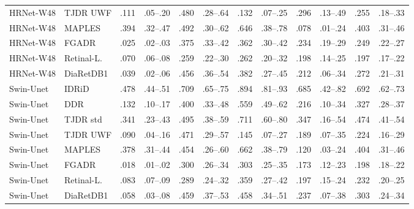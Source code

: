 \begin{landscape}
{\begin{longtable}{l l c c c c c c c c c c}
HRNet-W48 & TJDR UWF & .111 & \scriptsize .05--.20 & .480 & \scriptsize .28--.64 & .132 & \scriptsize .07--.25 & .296 & \scriptsize .13--.49 & .255 & \scriptsize .18--.33 \\
HRNet-W48 & MAPLES & .394 & \scriptsize .32--.47 & .492 & \scriptsize .30--.62 & .646 & \scriptsize .38--.78 & .078 & \scriptsize .01--.24 & .403 & \scriptsize .31--.46 \\
HRNet-W48 & FGADR & .025 & \scriptsize .02--.03 & .375 & \scriptsize .33--.42 & .362 & \scriptsize .30--.42 & .234 & \scriptsize .19--.29 & .249 & \scriptsize .22--.27 \\
HRNet-W48 & Retinal-L. & .070 & \scriptsize .06--.08 & .259 & \scriptsize .22--.30 & .262 & \scriptsize .20--.32 & .198 & \scriptsize .14--.25 & .197 & \scriptsize .17--.22 \\
HRNet-W48 & DiaRetDB1 & .039 & \scriptsize .02--.06 & .456 & \scriptsize .36--.54 & .382 & \scriptsize .27--.45 & .212 & \scriptsize .06--.34 & .272 & \scriptsize .21--.31 \\
Swin-Unet & IDRiD & .478 & \scriptsize .44--.51 & .709 & \scriptsize .65--.75 & .894 & \scriptsize .81--.93 & .685 & \scriptsize .42--.82 & .692 & \scriptsize .62--.73 \\
Swin-Unet & DDR & .132 & \scriptsize .10--.17 & .400 & \scriptsize .33--.48 & .559 & \scriptsize .49--.62 & .216 & \scriptsize .10--.34 & .327 & \scriptsize .28--.37 \\
Swin-Unet & TJDR std & .341 & \scriptsize .23--.43 & .495 & \scriptsize .38--.59 & .711 & \scriptsize .60--.80 & .347 & \scriptsize .16--.54 & .474 & \scriptsize .41--.54 \\
Swin-Unet & TJDR UWF & .090 & \scriptsize .04--.16 & .471 & \scriptsize .29--.57 & .145 & \scriptsize .07--.27 & .189 & \scriptsize .07--.35 & .224 & \scriptsize .16--.29 \\
Swin-Unet & MAPLES & .378 & \scriptsize .31--.44 & .454 & \scriptsize .26--.60 & .662 & \scriptsize .38--.79 & .120 & \scriptsize .03--.24 & .404 & \scriptsize .31--.46 \\
Swin-Unet & FGADR & .018 & \scriptsize .01--.02 & .300 & \scriptsize .26--.34 & .303 & \scriptsize .25--.35 & .173 & \scriptsize .12--.23 & .198 & \scriptsize .18--.22 \\
Swin-Unet & Retinal-L. & .083 & \scriptsize .07--.09 & .289 & \scriptsize .24--.32 & .359 & \scriptsize .27--.42 & .197 & \scriptsize .15--.24 & .232 & \scriptsize .20--.25 \\
Swin-Unet & DiaRetDB1 & .058 & \scriptsize .03--.08 & .459 & \scriptsize .37--.53 & .458 & \scriptsize .34--.51 & .237 & \scriptsize .07--.38 & .303 & \scriptsize .24--.34 \\

\end{longtable}}
\end{landscape}
